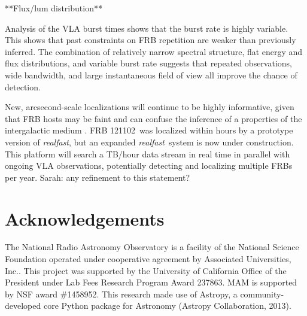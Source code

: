 \documentclass[twocolumn]{aastex61}
\newcommand{\rf}{\emph{realfast}}
\newcommand{\frb}{FRB 121102}
\begin{document}
**Flux/lum distribution**

Analysis of the VLA burst times shows that the burst rate is highly variable. This shows that past constraints on FRB repetition are weaker than previously inferred. The combination of relatively narrow spectral structure, flat energy and flux distributions, and variable burst rate suggests that repeated observations, wide bandwidth, and large instantaneous field of view all improve the chance of detection. 

New, arcsecond-scale localizations will continue to be highly informative, given that FRB hosts may be faint and can confuse the inference of a properties of the intergalactic medium \citep{2014ApJ...783L..35D}. \frb\ was localized within hours by a prototype version of \rf, but an expanded \rf\ system is now under construction. This platform will search a TB/hour data stream in real time in parallel with ongoing VLA observations, potentially detecting and localizing multiple FRBs per year. {\color{red} Sarah: any refinement to this statement?}



\section*{Acknowledgements}
The National Radio Astronomy Observatory is a facility of the National Science Foundation operated under cooperative agreement by Associated Universities, Inc..
This project was supported by the University of California Office of the President under Lab Fees Research Program Award 237863. MAM is supported by NSF award \#1458952.
This research made use of Astropy, a community-developed core Python package for Astronomy (Astropy Collaboration, 2013).




\end{document}
